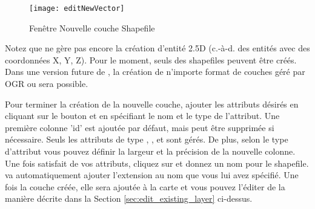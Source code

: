 \begin{figure}[ht]
  \begin{center}
  \texttt{[image: editNewVector]}
  \caption{Fenêtre Nouvelle couche Shapefile \nixcaption}\label{fig:newvectorlayer}
\end{center}
\end{figure}

Notez que \qg ne gère pas encore la création d'entité 2.5D (c.-à-d. des entités 
avec des coordonnées X, Y, Z). Pour le moment, seuls des shapefiles peuvent être 
créés. Dans une version future de \qg, la création de n'importe format de couches 
géré par OGR ou \psq sera possible.

Pour terminer la création de la nouvelle couche, ajouter les attributs désirés 
en cliquant sur le bouton  et en spécifiant le nom 
et le type de l'attribut. Une première colonne 'id' est ajoutée par défaut, mais 
peut être supprimée si nécessaire. Seuls les attributs de type , 
, et  sont gérés. De plus, 
selon le type d'attribut vous pouvez définir la largeur et la précision de la 
nouvelle colonne. Une fois satisfait de vos attributs, cliquez sur  
et donnez un nom pour le shapefile. \qg va automatiquement ajouter l'extension 
 au nom que vous lui avez spécifié. Une fois la couche créée, 
elle sera ajoutée à la carte et vous pouvez l'éditer de la manière décrite dans 
la Section \ref{sec:edit_existing_layer} ci-dessus.

